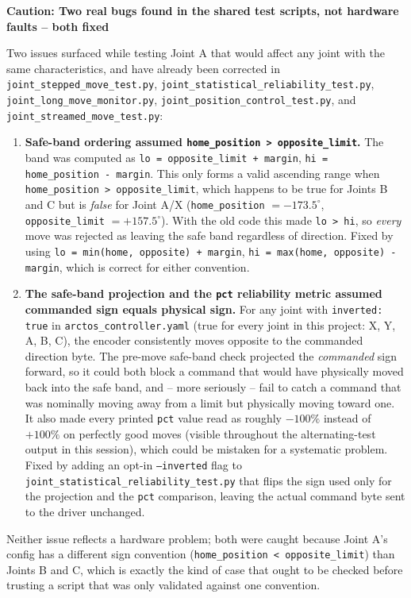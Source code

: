 \documentclass[11pt,letterpaper]{article}
\newenvironment{caution}[1]{%
    \par\addvspace{8pt}%
    \noindent{\color{cautionred}\rule{\linewidth}{0.8pt}}\par\vspace{2pt}
    \noindent\textbf{\color{cautionred}Caution: #1}\par\vspace{2pt}
}{%
    \par\vspace{2pt}\noindent{\color{cautionred}\rule{\linewidth}{0.4pt}}%
    \par\addvspace{8pt}%
}
\begin{document}
\begin{caution}{Two real bugs found in the shared test scripts, not hardware faults -- both fixed}
Two issues surfaced while testing Joint A that would affect any joint with the same characteristics, and have already been corrected in \texttt{joint\_stepped\_move\_test.py}, \texttt{joint\_statistical\_reliability\_test.py}, \texttt{joint\_long\_move\_monitor.py}, \texttt{joint\_position\_control\_test.py}, and \texttt{joint\_streamed\_move\_test.py}:
\begin{enumerate}
    \item \textbf{Safe-band ordering assumed \texttt{home\_position > opposite\_limit}.} The band was computed as \texttt{lo = opposite\_limit + margin}, \texttt{hi = home\_position - margin}. This only forms a valid ascending range when \texttt{home\_position > opposite\_limit}, which happens to be true for Joints B and C but is \emph{false} for Joint A/X (\texttt{home\_position} $= -173.5^\circ$, \texttt{opposite\_limit} $= +157.5^\circ$). With the old code this made \texttt{lo > hi}, so \emph{every} move was rejected as leaving the safe band regardless of direction. Fixed by using \texttt{lo = min(home, opposite) + margin}, \texttt{hi = max(home, opposite) - margin}, which is correct for either convention.
    \item \textbf{The safe-band projection and the \texttt{pct} reliability metric assumed commanded sign equals physical sign.} For any joint with \texttt{inverted: true} in \texttt{arctos\_controller.yaml} (true for every joint in this project: X, Y, A, B, C), the encoder consistently moves opposite to the commanded direction byte. The pre-move safe-band check projected the \emph{commanded} sign forward, so it could both block a command that would have physically moved back into the safe band, and -- more seriously -- fail to catch a command that was nominally moving away from a limit but physically moving toward one. It also made every printed \texttt{pct} value read as roughly $-100\%$ instead of $+100\%$ on perfectly good moves (visible throughout the alternating-test output in this session), which could be mistaken for a systematic problem. Fixed by adding an opt-in \texttt{--inverted} flag to \texttt{joint\_statistical\_reliability\_test.py} that flips the sign used only for the projection and the \texttt{pct} comparison, leaving the actual command byte sent to the driver unchanged.
\end{enumerate}
Neither issue reflects a hardware problem; both were caught because Joint A's config has a different sign convention (\texttt{home\_position \textless\ opposite\_limit}) than Joints B and C, which is exactly the kind of case that ought to be checked before trusting a script that was only validated against one convention.
\end{caution}
\end{document}
